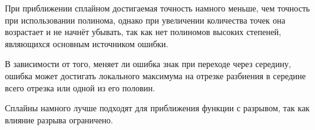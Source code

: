 \documentclass[a4paper]{article}
\begin{document}
При приближении сплайном достигаемая точность намного меньше, чем точность при использовании полинома, однако при
увеличении количества точек она возрастает и не начнёт убывать, так как нет полиномов высоких степеней, являющихся основным
источником ошибки.

В зависимости от того, меняет ли ошибка знак при переходе через середину, ошибка может достигать локального максимума на
отрезке разбиения в середине всего отрезка или одной из его половин.

Сплайны намного лучше подходят для приближения функции с разрывом, так как влияние разрыва ограничено.
\end{document}
